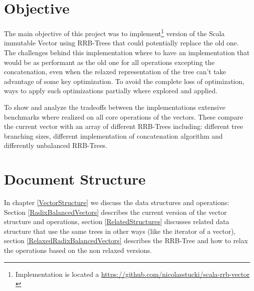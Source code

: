 \section{Objective}
The main objective of this project was to implement\footnote{Implementation is located a \url{https://github.com/nicolasstucki/scala-rrb-vector} \cite{projecRepo}} version of the Scala immutable Vector using RRB-Trees that could potentially replace the old one. The challenges behind this implementation where to have an implementation that would be as performant as the old one for all operations excepting the concatenation, even when the relaxed representation of the tree can't take advantage of some key optimization. To avoid the complete loss of optimization, ways to apply such optimizations partially where explored and applied.

To show and analyze the tradeoffs between the implementations extensive benchmarks where realized on all core operations of the vectors. These compare the current vector with an array of different RRB-Trees including: different tree branching sizes, different implementation of concatenation algorithm and differently unbalanced RRB-Trees.  

\section{Document Structure}
In chapter \ref{VectorStructure} we discuss the data structures and operations: Section \ref{RadixBalancedVectors} describes the current version of the vector structure and operations, section \ref{RelatedStructures} discusses related data structure that use the same trees in other ways (like the iterator of a vector), section \ref{RelaxedRadixBalancedVectors} describes the RRB-Tree and how to relax the operations based on the non relaxed versions.

